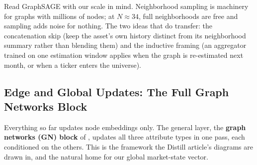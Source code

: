 \begin{projectconnection}
Read GraphSAGE with our scale in mind. Neighborhood sampling is machinery for graphs with millions of nodes; at $N \approx 34$, full neighborhoods are free and sampling adds noise for nothing. The two ideas that do transfer: the concatenation skip (keep the asset's own history distinct from its neighborhood summary rather than blending them) and the inductive framing (an aggregator trained on one estimation window applies when the graph is re-estimated next month, or when a ticker enters the universe).
\end{projectconnection}

\subsection{Edge and Global Updates: The Full Graph Networks Block}\label{sec:gnn:gnblock}

Everything so far updates node embeddings only. The general layer, the \textbf{graph networks (GN) block} of \citet{Battaglia2018}, updates all three attribute types in one pass, each conditioned on the others. This is the framework the Distill article's diagrams are drawn in, and the natural home for our global market-state vector.


